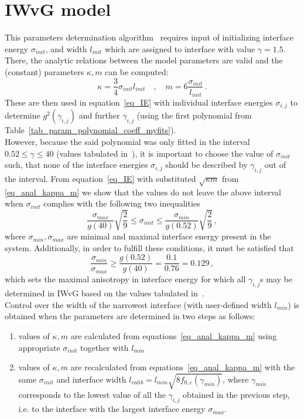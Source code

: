 \section*{IWvG model}
This parameters determination algorithm~\cite{Ravash2017} requires input of initializing interface energy $\sigma_{init}$, and width $l_{init}$ which are assigned to interface with value $\gamma=1.5$. There, the analytic relations between the model parameters are valid and the (constant) parameters $\kappa,m$ can be computed:
\begin{equation}\label{eq_anal_kappa_m}
	\kappa = \frac{3}{4}\sigma_{init}l_{init} \quad ,\quad m = 6\frac{\sigma_{init}}{l_{init}} \,.
\end{equation}
These are then used in equation~\eqref{eq_IE} with individual interface energies $\sigma_{i,j}$ to determine $g^2(\gamma_{i,j})$ and further $\gamma_{i,j}$ (using the first polynomial from Table~\ref{tab_param_polynomial_coeff_myfits}).\\
However, because the said polynomial was only fitted in the interval $0.52\leq\gamma\leq 40$ (values tabulated in~\cite{Ravash2017}), it is important to choose the value of $\sigma_{init}$ such, that none of the interface energies $\sigma_{i,j}$ should be described by $\gamma_{i,j}$ out of the interval. From equation~\eqref{eq_IE} with substituted $\sqrt{\kappa m}$ from \ref{eq_anal_kappa_m} we show that the values do not leave the above interval when $\sigma_{init}$ complies with the following two inequalities
\begin{equation}
	\frac{\sigma_{max}}{g(40)}\sqrt{\frac{2}{9}}\leq \sigma_{init}\leq \frac{\sigma_{min}}{g(0.52)}\sqrt{\frac{2}{9}} \,,
\end{equation}
where $\sigma_{min},\sigma_{max}$ are minimal and maximal interface energy present in the system. Additionally, in order to fulfill these conditions, it must be satisfied that
\begin{equation}
	\frac{\sigma_{min}}{\sigma_{max}} \geq \frac{g(0.52)}{g(40)} = \frac{0.1}{0.76} = 0.129 \,,
\end{equation}
which sets the maximal anisotropy in interface energy for which all $\gamma_{i,j}$s may be determined in IWvG based on the values tabulated in~\cite{Ravash2017}.\\
Control over the width of the narrowest interface (with user-defined width $l_{min}$) is obtained when the parameters are determined in two steps as follows:
\begin{enumerate}
	\item values of $\kappa,m$ are calculated from equations~\eqref{eq_anal_kappa_m} using appropriate $\sigma_{init}$ together with $l_{min}$
	\item values of $\kappa,m$ are recalculated from equations~\eqref{eq_anal_kappa_m} with the same $\sigma_{init}$ and interface width $l_{calib}=l_{min}\sqrt{8f_{0,c}(\gamma_{min})}$,  where $\gamma_{min}$ corresponds to the lowest value of all the $\gamma_{i,j}$ obtained in the previous step, i.e. to the interface with the largest interface energy $\sigma_{max}$. 
\end{enumerate}
